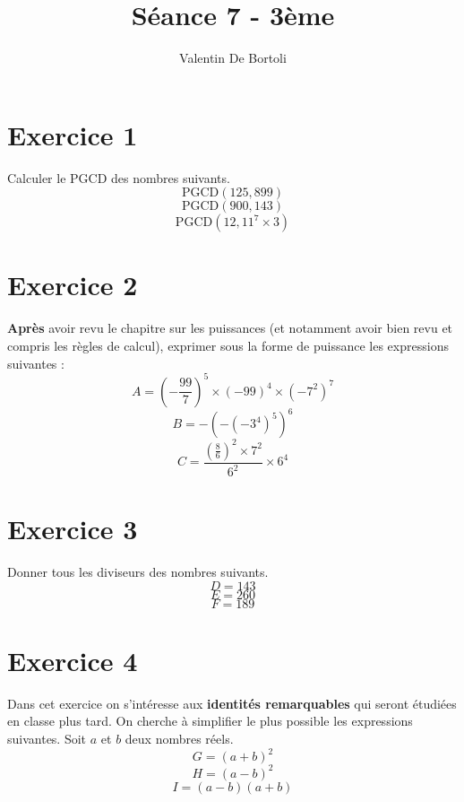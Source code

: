 \documentclass[10pt,a4paper]{article}
\title{Séance 7 - 3ème}
\author{Valentin De Bortoli}
\begin{document}
\maketitle
\section{Exercice 1}
Calculer le PGCD des nombres suivants.
\begin{equation}
\text{PGCD}(125,899)
\end{equation}
\begin{equation}
\text{PGCD}(900,143)
\end{equation}
\begin{equation}
\text{PGCD}(12,11^7 \times 3)
\end{equation}
\section{Exercice 2}
\textbf{Après} avoir revu le chapitre sur les puissances (et notamment avoir bien revu et compris les règles de calcul), exprimer sous la forme de puissance les expressions suivantes :
\begin{equation}
A=\left(-\frac{99}{7}\right)^5\times (-99)^4 \times (-7^2)^7
\end{equation}
\begin{equation}
B=-(-(-3^4)^5)^6
\end{equation}
\begin{equation}
C=\frac{\left(\frac{8}{6}\right)^2 \times 7^2}{6^2}\times 6^4
\end{equation}
\section{Exercice 3}
Donner tous les diviseurs des nombres suivants.
\begin{equation}
D=143
\end{equation}
\begin{equation}
E=260
\end{equation}
\begin{equation}
F=189
\end{equation}
\section{Exercice 4}
Dans cet exercice on s'intéresse aux \textbf{identités remarquables} qui seront étudiées en classe plus tard. On cherche à simplifier le plus possible les expressions suivantes. Soit $a$ et $b$ deux nombres réels.
\begin{equation}
G=(a+b)^2
\end{equation}
\begin{equation}
H=(a-b)^2
\end{equation}
\begin{equation}
I=(a-b)(a+b)
\end{equation}
\end{document}
